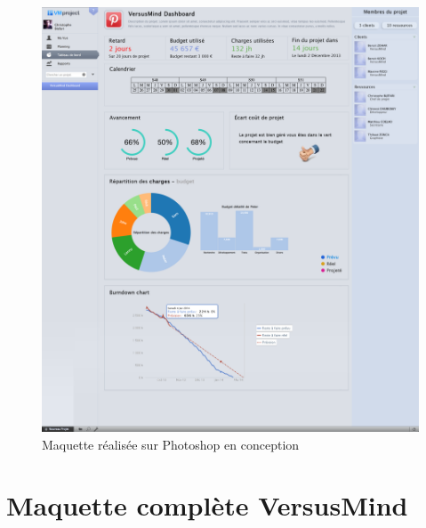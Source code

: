\documentclass[12pt]{report}
\begin{document}
\begin{appendices}
	\begin{figure}[!h]
	\centering
	\includegraphics[width=1\textwidth]{pictures/maquettenous.png}
	\caption{Maquette réalisée sur Photoshop en conception}
	\label{a3}
\end{figure}
	
	\chapter{Maquette complète VersusMind}
	

\end{appendices}
\end{document}
